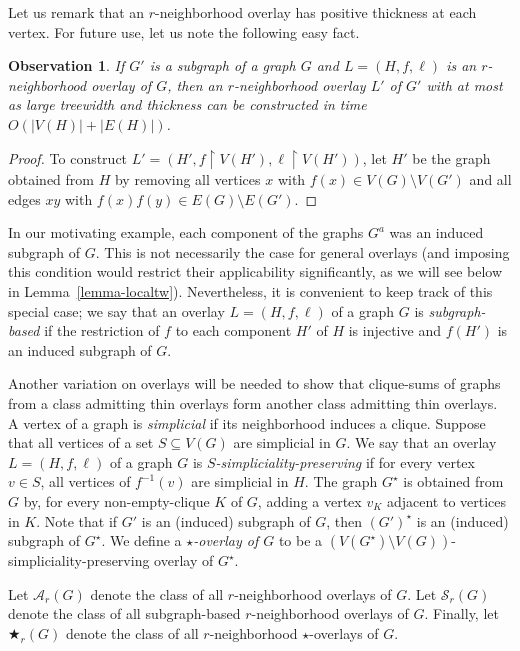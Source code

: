 \documentclass[a4paper,11pt]{article}
\newcommand{\Aa}{{\mathcal A}}
\newcommand{\Ss}{{\mathcal S}}
\newtheorem{observation}[theorem]{Observation}
\begin{document}
Let us remark that an $r$-neighborhood overlay has positive thickness at each vertex.
For future use, let us note the following easy fact.

\begin{observation}\label{obs-sg}
If $G'$ is a subgraph of a graph $G$ and $L=(H,f,\ell)$ is an $r$-neighborhood overlay of $G$, then
an $r$-neighborhood overlay $L'$ of $G'$ with at most as large treewidth and thickness
can be constructed in time $O(|V(H)|+|E(H)|)$.
\end{observation}
\begin{proof}
To construct $L'=(H',f\restriction V(H'), \ell\restriction V(H'))$, let $H'$ be the graph obtained
from $H$ by removing all vertices $x$ with $f(x)\in V(G)\setminus V(G')$ and all edges $xy$ with
$f(x)f(y)\in E(G)\setminus E(G')$.
\end{proof}

In our motivating example, each component of the graphs $G^a$ was an induced subgraph of $G$.  This is not
necessarily the case for general overlays (and imposing this condition would restrict their applicability
significantly, as we will see below in Lemma~\ref{lemma-localtw}).
Nevertheless, it is convenient to keep track of this special case; we say that an overlay $L=(H,f,\ell)$ of a graph $G$
is \emph{subgraph-based} if the restriction of $f$ to each component $H'$ of $H$ is injective
and $f(H')$ is an induced subgraph of $G$.

Another variation on overlays will be needed to show that clique-sums of graphs from a class admitting thin
overlays form another class admitting thin overlays.
A vertex of a graph is \emph{simplicial} if its neighborhood induces a clique.
Suppose that all vertices of a set $S\subseteq V(G)$ are simplicial in $G$.
We say that an overlay $L=(H,f,\ell)$ of a graph $G$ is \emph{$S$-simpliciality-preserving} if for every vertex $v\in S$, all vertices
of $f^{-1}(v)$ are simplicial in $H$.
The graph $G^\star$ is obtained from $G$ by, for every non-empty-clique $K$ of $G$, adding a vertex $v_K$ adjacent to vertices in
$K$.  Note that if $G'$ is an (induced) subgraph of $G$, then $(G')^\star$ is an (induced) subgraph
of $G^\star$.  We define a \emph{$\star$-overlay of $G$} to be
a $(V(G^\star)\setminus V(G))$-simpliciality-preserving overlay of $G^\star$.

Let $\Aa_r(G)$ denote the class of all $r$-neighborhood overlays of $G$.
Let $\Ss_r(G)$ denote the class of all subgraph-based $r$-neighborhood overlays of $G$.
Finally, let $\bigstar_r(G)$ denote the class of all $r$-neighborhood $\star$-overlays of $G$.
\end{document}
